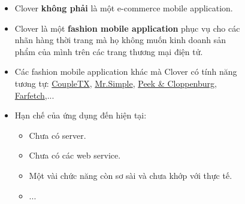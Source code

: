\documentclass{beamer}
\begin{document}
\begin{frame}
\begin{columns}
\begin{figure}
        \end{figure}
        \begin{itemize}
            \item Clover \textbf{không phải} là một e-commerce mobile application.
            \item Clover là một \textbf{fashion mobile application} phục vụ cho các nhãn hàng thời trang mà họ không muốn kinh doanh sản phẩm của mình trên các trang thương mại điện tử.
            \item Các fashion mobile application khác mà Clover có tính năng tương tự: \href{https://play.google.com/store/apps/details?id=com.coupletx&hl=vi&gl=US}{\color{blue} CoupleTX}, \href{https://play.google.com/store/apps/details?id=vn.mrsimple&hl=en&gl=US}{\color{blue} Mr.Simple}, \href{https://play.google.com/store/apps/details?id=com.peekcloppenburg.mobileshop&hl=en&gl=US}{\color{blue} Peek \& Cloppenburg}, \href{https://play.google.com/store/apps/details?id=com.farfetch.farfetchshop&hl=en&gl=US}{\color{blue} Farfetch},...

            \item Hạn chế của ứng dụng đến hiện tại:
                  \begin{itemize}
                      \item Chưa có server.
                      \item Chưa có các web service.
                      \item Một vài chức năng còn sơ sài và chưa khớp với thực tế.
                      \item ...
                  \end{itemize}
        \end{itemize}
    \end{columns}
\end{frame}
\end{document}
